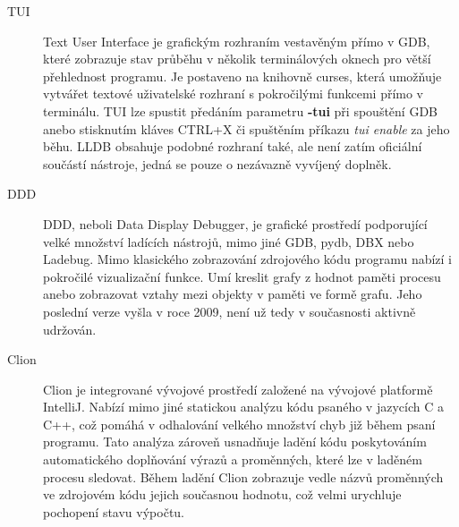 \documentclass[bc,male,python,dept460]{diploma}						%
\begin{document}
		\begin{description}
			\item[TUI]
				Text User Interface je grafickým rozhraním vestavěným přímo v GDB, které zobrazuje stav průběhu v několik terminálových oknech pro větší přehlednost
				programu. Je postaveno na knihovně curses, která umožňuje vytvářet textové uživatelské rozhraní s pokročilými funkcemi přímo v terminálu. TUI lze
				spustit předáním parametru \textbf{-tui} při spouštění GDB anebo stisknutím kláves CTRL+X či spuštěním příkazu \emph{tui enable} za jeho běhu.
				LLDB obsahuje podobné rozhraní také, ale není zatím oficiální součástí nástroje, jedná se pouze o nezávazně vyvíjený doplněk.
			\item[DDD]
				DDD, neboli Data Display Debugger, je grafické prostředí podporující velké množství ladících nástrojů, mimo jiné GDB, pydb, DBX nebo Ladebug.
				Mimo klasického zobrazování zdrojového kódu programu nabízí i pokročilé vizualizační funkce. Umí kreslit grafy z hodnot paměti procesu
				anebo zobrazovat vztahy mezi objekty v paměti ve formě grafu. Jeho poslední verze vyšla v roce 2009, není už tedy v současnosti aktivně udržován.		
			\item[Clion]
				Clion je integrované vývojové prostředí založené na vývojové platformě IntelliJ. Nabízí mimo jiné statickou analýzu kódu psaného v jazycích
				C a C++, což pomáhá v odhalování velkého množství chyb již během psaní programu. Tato analýza zároveň usnadňuje ladění kódu poskytováním
				automatického doplňování výrazů a proměnných, které lze v laděném procesu sledovat. Během ladění Clion zobrazuje vedle názvů proměnných
				ve zdrojovém kódu jejich současnou hodnotu, což velmi urychluje pochopení stavu výpočtu.
		\end{description}
\end{document}
